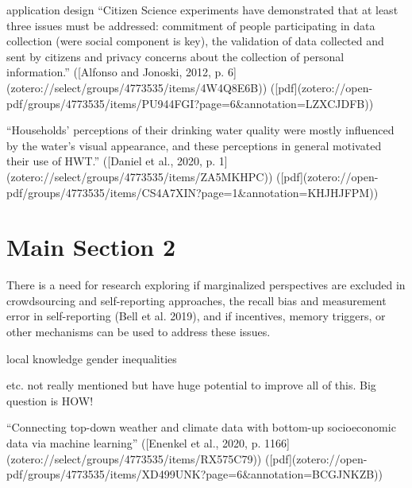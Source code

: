 application design 
“Citizen Science experiments have demonstrated that at least three issues must be addressed: commitment of people participating in data collection (were social component is key), the validation of data collected and sent by citizens and privacy concerns about the collection of personal information.” ([Alfonso and Jonoski, 2012, p. 6](zotero://select/groups/4773535/items/4W4Q8E6B)) ([pdf](zotero://open-pdf/groups/4773535/items/PU944FGI?page=6\&annotation=LZXCJDFB))

“Households’ perceptions of their drinking water quality were mostly influenced by the water’s visual appearance, and these perceptions in general motivated their use of HWT.” ([Daniel et al., 2020, p. 1](zotero://select/groups/4773535/items/ZA5MKHPC)) ([pdf](zotero://open-pdf/groups/4773535/items/CS4A7XIN?page=1&annotation=KHJHJFPM))



\section{Main Section 2}

There is a need for research exploring if marginalized perspectives are excluded in crowdsourcing and self-reporting approaches, the recall bias and measurement error in self-reporting (Bell et al. 2019), and if incentives, memory triggers, or other mechanisms can be used to address these issues.


local knowledge
gender inequalities

etc. not really mentioned but have huge potential to improve all of this. Big question is HOW!

“Connecting top-down weather and climate data with bottom-up socioeconomic data via machine learning” ([Enenkel et al., 2020, p. 1166](zotero://select/groups/4773535/items/RX575C79)) ([pdf](zotero://open-pdf/groups/4773535/items/XD499UNK?page=6&annotation=BCGJNKZB))


